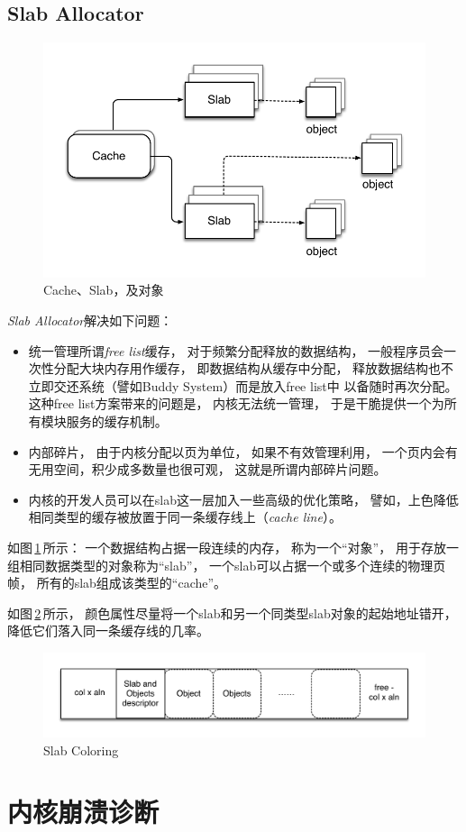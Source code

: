 \documentclass[11pt]{article}
\begin{document}
\subsection{Slab Allocator}
\begin{figure}[!ht]
\centering
\includegraphics[scale=0.8]{fig/slab}
\caption{Cache、Slab，及对象}
\label{fig:slab}
\end{figure}

{\em Slab Allocator}解决如下问题：
\begin{itemize}
  \item 统一管理所谓{\em free list}缓存，
    对于频繁分配释放的数据结构，
    一般程序员会一次性分配大块内存用作缓存，
    即数据结构从缓存中分配，
    释放数据结构也不立即交还系统（譬如Buddy System）而是放入free list中%
    以备随时再次分配。
    这种free list方案带来的问题是，
    内核无法统一管理，
    于是干脆提供一个为所有模块服务的缓存机制。

  \item 内部碎片，
    由于内核分配以页为单位，
    如果不有效管理利用，
    一个页内会有无用空间，积少成多数量也很可观，
    这就是所谓内部碎片问题。

  \item 内核的开发人员可以在slab这一层加入一些高级的优化策略，
    譬如，上色降低相同类型的缓存被放置于同一条缓存线上（{\em cache line}）。
\end{itemize}

如图\,\ref{fig:slab}\,所示：
一个数据结构占据一段连续的内存，
称为一个“对象”，
用于存放一组相同数据类型的对象称为“slab”，
一个slab可以占据一个或多个连续的物理页帧，
所有的slab组成该类型的“cache”。

如图\,\ref{fig:slabc}\,所示，
颜色属性尽量将一个slab和另一个同类型slab对象的起始地址错开，
降低它们落入同一条缓存线的几率。

\begin{figure}[!ht]
\centering
\includegraphics[scale=0.72]{fig/slab_color}
\caption{Slab Coloring}
\label{fig:slabc}
\end{figure}

\section{内核崩溃诊断}
\end{document}
